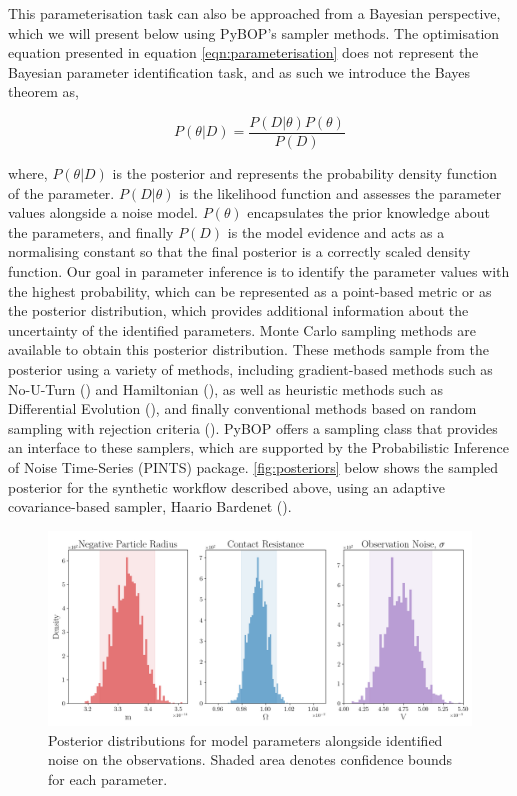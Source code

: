 \documentclass[
]{article}
\begin{document}
This parameterisation task can also be approached from a Bayesian
perspective, which we will present below using PyBOP's sampler methods.
The optimisation equation presented in equation
\autoref{eqn:parameterisation} does not represent the Bayesian parameter
identification task, and as such we introduce the Bayes theorem as,

\begin{equation}
P(\theta|D) = \frac{P(D|\theta)P(\theta)}{P(D)}
\label{eqn:bayes_theorem}
\end{equation}

where, \(P(\theta|D)\) is the posterior and represents the probability
density function of the parameter. \(P(D|\theta)\) is the likelihood
function and assesses the parameter values alongside a noise model.
\(P(\theta)\) encapsulates the prior knowledge about the parameters, and
finally \(P(D)\) is the model evidence and acts as a normalising
constant so that the final posterior is a correctly scaled density
function. Our goal in parameter inference is to identify the parameter
values with the highest probability, which can be represented as a
point-based metric or as the posterior distribution, which provides
additional information about the uncertainty of the identified
parameters. Monte Carlo sampling methods are available to obtain this
posterior distribution. These methods sample from the posterior using a
variety of methods, including gradient-based methods such as No-U-Turn
() and Hamiltonian
(), as well as
heuristic methods such as Differential Evolution
(), and finally
conventional methods based on random sampling with rejection criteria
(). PyBOP offers
a sampling class that provides an interface to these samplers, which are
supported by the Probabilistic Inference of Noise Time-Series (PINTS)
package. \autoref{fig:posteriors} below shows the sampled posterior for
the synthetic workflow described above, using an adaptive
covariance-based sampler, Haario Bardenet
().

\begin{figure}
\centering
\includegraphics[width=1\textwidth,height=\textheight]{figures/joss/posteriors.png}
\caption{Posterior distributions for model parameters alongside
identified noise on the observations. Shaded area denotes confidence
bounds for each parameter. \label{fig:posteriors}}
\end{figure}
\end{document}
